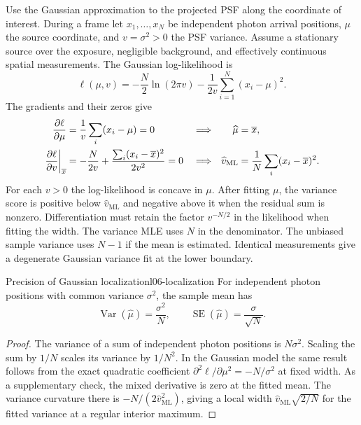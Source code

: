 Use the Gaussian approximation to the projected PSF along the coordinate of interest. During a frame let $x_1,\ldots,x_N$ be independent photon arrival positions, $\mu$ the source coordinate, and $v=\sigma^2>0$ the PSF variance. Assume a stationary source over the exposure, negligible background, and effectively continuous spatial measurements. The Gaussian log-likelihood is
\begin{equation}
 \ell(\mu,v)=-\frac{N}{2}\ln(2\pi v)-\frac{1}{2v}\sum_{i=1}^N(x_i-\mu)^2.
 \label{eq:l06-gaussian-likelihood}
\end{equation}
The gradients and their zeros give
\begin{align}
 \frac{\partial\ell}{\partial\mu}
   &=\frac{1}{v}\sum_i(x_i-\mu)=0
   &&\Longrightarrow &\widehat\mu&=\overline x,\notag\\
 \left.\frac{\partial\ell}{\partial v}\right|_{\overline x}
   &=-\frac{N}{2v}+\frac{\sum_i(x_i-\overline x)^2}{2v^2}=0
   &&\Longrightarrow &\widehat v_{\mathrm{ML}}&=\frac{1}{N}\sum_i(x_i-\overline x)^2.
 \label{eq:l06-gaussian-mle}
\end{align}
For each $v>0$ the log-likelihood is concave in $\mu$. After fitting $\mu$, the variance score is positive below $\widehat v_{\mathrm{ML}}$ and negative above it when the residual sum is nonzero. Differentiation must retain the factor $v^{-N/2}$ in the likelihood when fitting the width. The variance MLE uses $N$ in the denominator. The unbiased sample variance uses $N-1$ if the mean is estimated. Identical measurements give a degenerate Gaussian variance fit at the lower boundary.

\begin{theorem}{Precision of Gaussian localization}{l06-localization}
For independent photon positions with common variance $\sigma^2$, the sample mean has
\begin{equation}
 \boxed{\operatorname{Var}(\widehat\mu)=\frac{\sigma^2}{N},
        \qquad \operatorname{SE}(\widehat\mu)=\frac{\sigma}{\sqrt{N}}.}
 \label{eq:l06-localization-error}
\end{equation}
\end{theorem}

\begin{proof}
The variance of a sum of independent photon positions is $N\sigma^2$. Scaling the sum by $1/N$ scales its variance by $1/N^2$. In the Gaussian model the same result follows from the exact quadratic coefficient $\partial^2\ell/\partial\mu^2=-N/\sigma^2$ at fixed width. As a supplementary check, the mixed derivative is zero at the fitted mean. The variance curvature there is $-N/(2\widehat v_{\mathrm{ML}}^2)$, giving a local width $\widehat v_{\mathrm{ML}}\sqrt{2/N}$ for the fitted variance at a regular interior maximum.
\end{proof}

